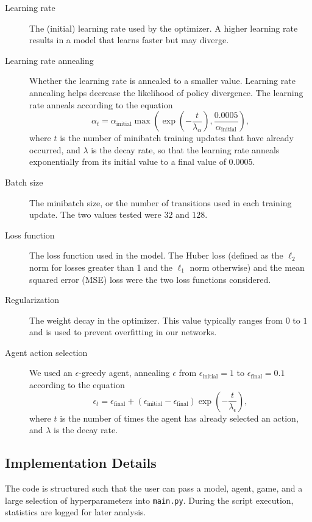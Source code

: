 \documentclass[11pt]{article}
\begin{document}
\begin{description}
    \item[Learning rate] The (initial) learning rate used by the optimizer. A higher learning rate results in a model that learns faster but may diverge.
    
    \item[Learning rate annealing] Whether the learning rate is annealed to a smaller value. Learning rate annealing helps decrease the likelihood of policy divergence. The learning rate anneals according to the equation $$\alpha_t = \alpha_\text{initial} \max\left(\exp\left(-\frac{t}{\lambda_\alpha}\right), \frac{0.0005}{\alpha_\text{initial}}\right),$$ where $t$ is the number of minibatch training updates that have already occurred, and $\lambda$ is the decay rate, so that the learning rate anneals exponentially from its initial value to a final value of $0.0005$.
    
    \item[Batch size] The minibatch size, or the number of transitions used in each training update. The two values tested were $32$ and $128$.
    
    \item[Loss function] The loss function used in the model. The Huber loss (defined as the $\ell_2$ norm for losses greater than 1 and the $\ell_1$ norm otherwise) and the mean squared error (MSE) loss were the two loss functions considered.
    
    \item[Regularization] The weight decay in the optimizer. This value typically ranges from $0$ to $1$ and is used to prevent overfitting in our networks.
    
    \item[Agent action selection] We used an $\epsilon$-greedy agent, annealing $\epsilon$ from $\epsilon_\text{initial} = 1$ to $\epsilon_\text{final} = 0.1$ according to the equation $$\epsilon_t = \epsilon_\text{final} + (\epsilon_\text{initial} - \epsilon_\text{final}) \exp\left(-\frac{t}{\lambda_\epsilon}\right),$$ where $t$ is the number of times the agent has already selected an action, and $\lambda$ is the decay rate. 
\end{description}

\subsection{Implementation Details}

The code is structured such that the user can pass a model, agent, game, and a large selection of hyperparameters into \texttt{main.py}. During the script execution, statistics are logged for later analysis. 
\end{document}
